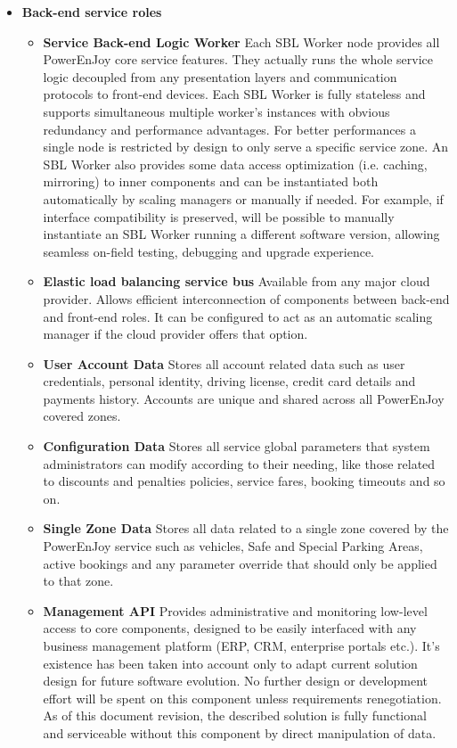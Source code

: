 \begin{itemize}
\item{\textbf{Back-end service roles}}
\begin{itemize}
\item{\textbf{Service Back-end Logic Worker}}\newline
Each SBL Worker node provides all PowerEnJoy core service features. They actually runs the whole service logic decoupled from any presentation layers and communication protocols to front-end devices. Each SBL Worker is fully stateless and supports simultaneous multiple worker's instances with obvious redundancy and performance advantages. For better performances a single node is restricted by design to only serve a specific service zone. An SBL Worker also provides some data access optimization (i.e. caching, mirroring) to inner components and can be instantiated both automatically by scaling managers or manually if needed. For example, if interface compatibility is preserved, will be possible to manually instantiate an SBL Worker running a different software version, allowing seamless on-field testing, debugging and upgrade experience.
\item{\textbf{Elastic load balancing service bus}}\newline
Available from any major cloud provider. Allows efficient interconnection of components between back-end and front-end roles. It can be configured to act as an automatic scaling manager if the cloud provider offers that option.
\item{\textbf{User Account Data}}\newline
Stores all account related data such as user credentials, personal identity, driving license, credit card details and payments history. Accounts are unique and shared across all PowerEnJoy covered zones.
\item{\textbf{Configuration Data}}\newline
Stores all service global parameters that system administrators can modify according to their needing, like those related to discounts and penalties policies, service fares, booking timeouts and so on.
\item{\textbf{Single Zone Data}}\newline
Stores all data related to a single zone covered by the PowerEnJoy service such as vehicles, Safe and Special Parking Areas, active bookings and any parameter override that should only be applied to that zone.
\item{\textbf{Management API}}\newline
Provides administrative and monitoring low-level access to core components, designed to be easily interfaced with any business management platform (ERP, CRM, enterprise portals etc.). It's existence has been taken into account only to adapt current solution design for future software evolution. No further design or development effort will be spent on this component unless requirements renegotiation. As of this document revision, the described solution is fully functional and serviceable without this component by direct manipulation of data.
\end{itemize}
\end{itemize}

